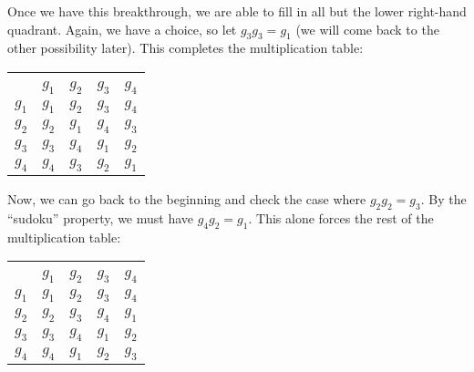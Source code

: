     Once we have this breakthrough, we are able to fill in all but the lower right-hand quadrant. Again, we have a choice, so let $g_3g_3 = g_1$ (we will come back to the other possibility later). This completes the multiplication table:
    

    \begin{center}
        \begin{tabular}{c| *{4}{c}}
        \multicolumn{5}{c}{} \\
        $\text{ }$ & $g_1$ & $g_2$ & $g_3$ & $g_4$ \\
        \hline
        $g_1$ &  $g_1$ & $g_2$ & $g_3$ & $g_4$ \\
        $g_2$ & $g_2$ & $g_1$ & $g_4$ & $g_3$ \\
        $g_3$ & $g_3$ & $g_4$ & $g_1$ & $g_2$ \\
        $g_4$ & $g_4$ & $g_3$ & $g_2$ & $g_1$
        \end{tabular}
    \end{center}




    Now, we can go back to the beginning and check the case where $g_2g_2 = g_3.$ By the ``sudoku'' property, we must have $g_4g_2 = g_1.$ This alone forces the rest of the multiplication table:

    \begin{center}
        \begin{tabular}{c| *{4}{c}}
        \multicolumn{5}{c}{} \\
        $\text{ }$ & $g_1$ & $g_2$ & $g_3$ & $g_4$ \\
        \hline
        $g_1$ &  $g_1$ & $g_2$ & $g_3$ & $g_4$ \\
        $g_2$ & $g_2$ & $g_3$ & $g_4$ & $g_1$ \\
        $g_3$ & $g_3$ & $g_4$ & $g_1$ & $g_2$ \\
        $g_4$ & $g_4$ & $g_1$ & $g_2$ & $g_3$
        \end{tabular}
    \end{center}


